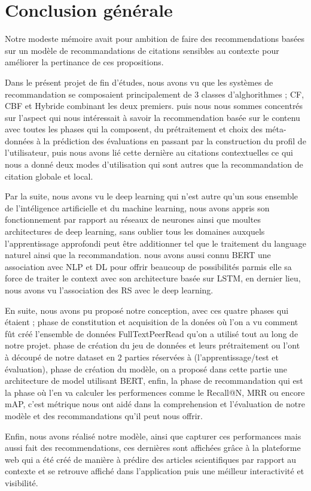 \chapter*{\textbf{Conclusion générale}}

\par Notre modeste mémoire avait pour ambition de faire des recommendations basées sur un modèle de recommandations de citations sensibles au contexte pour améliorer la pertinance de ces propositions.

\par Dans le présent projet de fin d’études, nous avons vu que les systèmes de recommandation se composaient principalement de 3 classes d'alghorithmes ; CF, CBF et Hybride combinant les deux premiers. puis nous nous sommes concentrés sur l'aspect qui nous intéressait à savoir la recommendation basée sur le contenu avec toutes les phases qui la composent, du prétraitement et choix des méta-données à la prédiction des évaluations en passant par la construction du profil de l'utilisateur, puis nous avons lié cette dernière au citations contextuelles ce qui nous a donné deux modes d'utilisation qui sont autres que la recommandation de citation globale et local.

\par Par la suite, nous avons vu le deep learning qui n'est autre qu'un sous ensemble de l'intéligence artificielle et du machine learning, nous avons appris son fonctionnement par rapport au réseaux de neurones ainsi que moultes architectures de deep learning, sans oublier tous les domaines auxquels l'apprentissage approfondi peut être additionner tel que le traitement du language naturel ainsi que la recommandation. nous avons aussi connu BERT une association avec NLP et DL pour offrir beaucoup de possibilités parmis elle sa force de traiter le context avec son architecture basée sur LSTM, en dernier lieu, nous avons vu l'association des RS avec le deep learning.

\par En suite, nous avons pu proposé notre conception, avec ces quatre phases qui étaient ; phase de constitution et acquisition de la donées où l'on a vu comment fût créé l'ensemble de données FullTextPeerRead qu'on a utilisé tout au long de notre projet. phase de création du jeu de données et leurs prétraitement ou l'ont à découpé de notre dataset en 2 parties réservées à (l'apprentissage/test et évaluation), phase de création du modèle, on a proposé dans cette partie une architecture de model utilisant BERT, enfin, la phase de recommandation qui est la phase où l'en va calculer les performences comme le Recall@N, MRR ou encore mAP, c'est métrique nous ont aidé dans la comprehension et l'évaluation de notre modèle et des recommandations qu'il peut nous offrir.

\par Enfin, nous avons réalisé notre modèle, ainsi que capturer ces performances mais aussi fait des recommendations, ces dernières sont affichées grâce à la plateforme web qui a été créé de manière à prédire des articles scientifiques par rapport au contexte et se retrouve affiché dans l'application puis une méilleur interactivité et visibilité.


